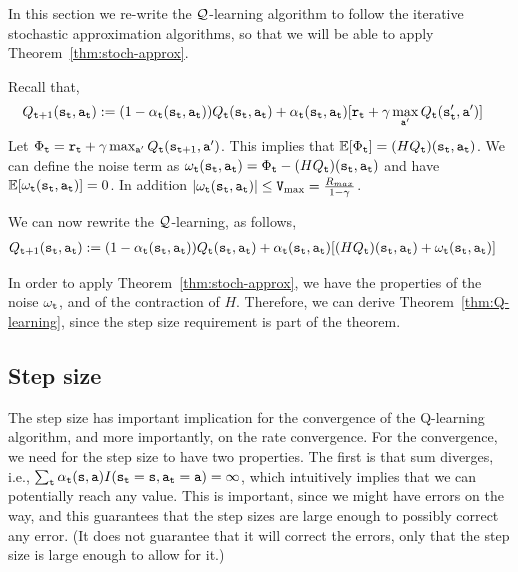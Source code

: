 In this section we re-write the $\mathcal{Q}$-learning algorithm to follow the
iterative stochastic approximation algorithms, so that we will be
able to apply Theorem~\ref{thm:stoch-approx}.

Recall that,
\begin{align*}
 Q_{{\tt t}+1}({\tt s}_{\tt t},{\tt a}_{\tt t}) & :=   (1-\alpha_{\tt t}({\tt s}_{\tt t},{\tt a}_{\tt t}) ) Q_{\tt t} ({\tt s}_{\tt t},{\tt a}_{\tt t}) + \alpha_{\tt t}({\tt s}_{\tt t},{\tt a}_{\tt t})  [{\tt r}_{\tt t} +
\gamma \max_{{\tt a}'} Q_{\tt t} ({\tt s}_{{\tt t}}',
{\tt a}')]
\end{align*}
Let $\Phi_{\tt t}={\tt r}_{\tt t} + \gamma \max_{{\tt a}'} Q_{\tt t}
({\tt s}_{{\tt t}+1}, {\tt a}')$. This implies that $\mathbb{E}[\Phi_{\tt t}]=
(HQ_{\tt t})({\tt s}_{\tt t},{\tt a}_{\tt t})$. We can define the noise
term as
$\omega_{\tt t}({\tt s}_{\tt t},{\tt a}_{\tt t})=\Phi_{\tt t}-(HQ_{\tt t})({\tt s}_{\tt t},{\tt a}_{\tt t})$
and have $\mathbb{E}[\omega_{\tt t}({\tt s}_{\tt t},{\tt a}_{\tt t})]=0$. In
addition $|\omega_{\tt t}({\tt s}_{\tt t},{\tt a}_{\tt t})|\leq {\tt V}_{\max }=
\frac{R_{max}}{1-\gamma}$.

We can now rewrite the $\mathcal{Q}$-learning, as follows,
\begin{align*}
 Q_{{\tt t}+1}({\tt s}_{\tt t},{\tt a}_{\tt t}) & :=   (1-\alpha_{\tt t}({\tt s}_{\tt t},{\tt a}_{\tt t}) ) Q_{\tt t} ({\tt s}_{\tt t},{\tt a}_{\tt t}) + \alpha_{\tt t}({\tt s}_{\tt t},{\tt a}_{\tt t})
 [(HQ_{\tt t})({\tt s}_{\tt t},{\tt a}_{\tt t})+\omega_{\tt t}({\tt s}_{\tt t},{\tt a}_{\tt t})]
\end{align*}

In order to apply Theorem~\ref{thm:stoch-approx}, we have the
properties of the noise $\omega_{\tt t}$, and of the contraction of
$H$. Therefore, we can derive Theorem~\ref{thm:Q-learning}, since
the step size requirement is part of the theorem.

\subsection{Step size}

The step size has important implication for the convergence of the
Q-learning algorithm, and more importantly, on the rate convergence.
For the convergence, we need for the step size to have two
properties. The first is that sum diverges, i.e., $\sum_{\tt t}
\alpha_{\tt t}({\tt s},{\tt a})
I({\tt s}_{\tt t}={\tt s},{\tt a}_{\tt t}={\tt a})=\infty $, which
intuitively implies that we can potentially reach any value. This is
important, since we might have errors on the way, and this
guarantees that the step sizes are large enough to possibly
correct any error. (It does not guarantee that it will correct the
errors, only that the step size is large enough to allow for it.)

